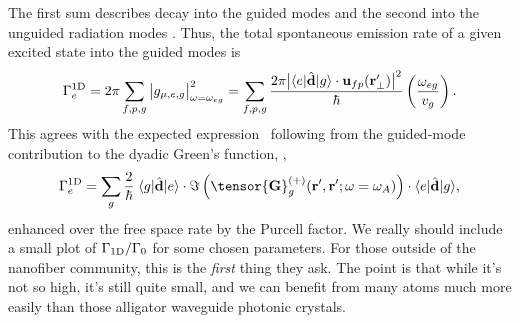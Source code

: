 \documentclass[preprint,aps,pra,onecolumn]{revtex4-1} %
\newcommand{\oneD}{{\rm 1D}}
\newcommand{\comment}[1]{{\color{Maroon} #1}}
\begin{document}
The first sum describes decay into the guided modes and the second into the unguided radiation 
modes \cite{domokos_quantum_2002, klimov_spontaneous_2004,le_kien_spontaneous_2005}.  Thus, the total spontaneous emission rate of a given excited state into the guided modes is
\begin{equation}
\Gamma_e^{\oneD}= 2\pi \sum_{f,p,g} \big|g_{\mu,e,g} \big|^2_{\omega = \omega_{eg}} =  \sum_{f,p,g}\frac{2 \pi \big|\bra{e}\hat{\mathbf{d}}\ket{g} \cdot \mathbf{u}_{fp}(\br'_\perp)\big|^2}{\hbar} 
\left(\frac{\omega_{eg}}{v_g}\right).
\end{equation}
This agrees with the expected expression~\cite{?} following from the guided-mode contribution to the 
dyadic Green's function, ,
\begin{equation}
\Gamma_e^{\oneD} = \sum_{g}   \frac{2}{\hbar} \; \bra{g}\hat{\mathbf{d}}\ket{e}\cdot 
\Im\left(\tensor{\mathbf{G}}^{(+)}_g(\br', \br'; \omega= \omega_A) \right) \cdot 
\bra{e}\hat{\mathbf{d}}\ket{g},
\end{equation}
enhanced over the free space rate by the Purcell factor.  \comment{We really should include a small plot of $\Gamma_{\rm 1D}/\Gamma_0$ for some chosen parameters.  For those outside of the nanofiber community, this is the \emph{first} thing they ask.  The point is that while it's not so high, it's still quite small, and we can  benefit from many atoms much more easily than those alligator waveguide photonic crystals.}
\end{document}
